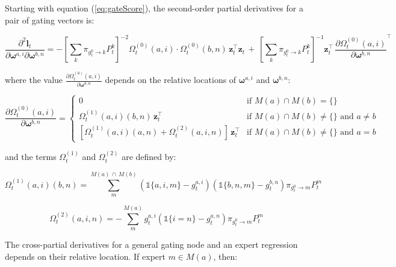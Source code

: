\documentclass[12pt]{article}
\newcommand{\bw}[1]{\boldsymbol{\omega}^{#1}}
\newcommand{\gateprod}[2]{\pi_{#1 \longrightarrow #2}}
\newcommand{\FnOmegaNaught}[2]{\Omega^{(0)}_{t}( #1, #2 )}
\newcommand{\FnOmegaOne}[4]{\Omega^{(1)}_{t}(#1, #2)(#3, #4)}
\newcommand{\FnOmegaTwo}[3]{\Omega^{(2)}_{t}(#1, #2, #3)}
\theoremstyle{definition}
\begin{document}
\bigskip

Starting with equation (\ref{eq:gateScore}), the second-order partial
derivatives for a pair of gating vectors is:

\begin{equation} \label{eq:nodehessian}
  \frac{\partial^{2} \boldsymbol{l}_{t}}{\partial \boldsymbol{\omega}^{a, i} \partial \boldsymbol{\omega}^{b,n}} = - \left[ \sum_{k} \gateprod{g^{0}_{t}}{k} P^{k}_{t} \right]^{-2} \FnOmegaNaught{a}{i} \cdot \FnOmegaNaught{b}{n} \, \boldsymbol{z}^{\top}_{t} \boldsymbol{z}_{t} \, + \, \left[ \sum_{k} \gateprod{g^{0}_{t}}{k} P^{k}_{t}\right]^{-1} \boldsymbol{z}^{\top}_{t} \, \frac{ \partial \FnOmegaNaught{a}{i} }{\partial \bw{b, n}}^{\top}
\end{equation}

where the value $\frac{ \partial \FnOmegaNaught{a}{i} }{\partial \bw{b, n}}$
depends on the relative locations of $\bw{a, i}$ and $\bw{b, n}$:

\begin{equation}
  \frac{ \partial \FnOmegaNaught{a}{i} }{\partial \boldsymbol{\omega}^{b, n}} = \begin{cases} 
       0 & \textrm{if $M(a) \cap M(b) = \{ \}$} \\
       \FnOmegaOne{a}{i}{b}{n}  \, \boldsymbol{z}_{t}^{\top} & \textrm{if $M(a) \cap M(b) \neq \{ \}$ and $a \neq b$} \\
       \left[ \FnOmegaOne{a}{i}{a}{n} + \FnOmegaTwo{a}{i}{n} \right] \, \boldsymbol{z}_{t}^{\top} & \textrm{if $M(a) \cap M(b) \neq \{ \}$ and $a = b$}
    \end{cases}
\end{equation}

and the terms $\Omega^{(1)}_{t}$ and $\Omega^{(2)}_{t}$ are defined by:

\begin{equation}
  \FnOmegaOne{a}{i}{b}{n} = \sum_{m}^{ M(a) \, \cap \, M(b) } \left( \mathbb{1}\{a, i, m\} - g^{a,i}_{t} \right) \left( \mathbb{1}\{b, n, m\} - g^{b,n}_{t} \right) \gateprod{g^{0}_{t}}{m} P^{m}_{t}
\end{equation}

\begin{equation}
  \FnOmegaTwo{a}{i}{n} = - \sum_{m}^{M(a)} g^{a, i}_{t} ( \mathbb{1}\{i = n\} - g^{a, n}_{t} ) \gateprod{g^{0}_{t}}{m} P^{m}_{t}
\end{equation}

The cross-partial derivatives for a general gating node and an expert
regression depends on their relative location. If expert $m \in M(a)$,
then:
\end{document}
